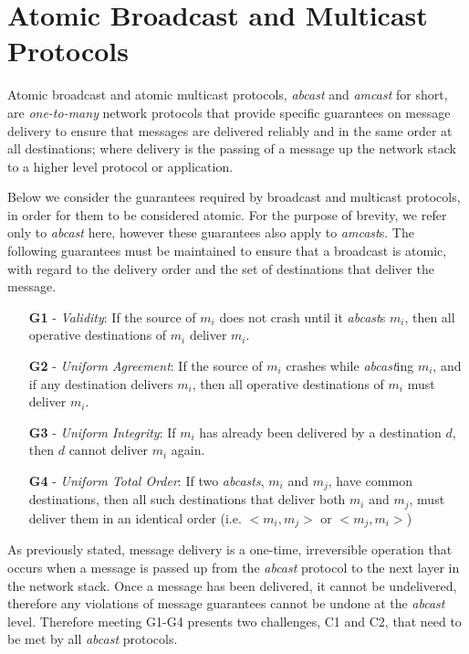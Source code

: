 \section{Atomic Broadcast and Multicast Protocols} \label{sec:atomic_guarantees}
Atomic broadcast and atomic multicast protocols, \emph{abcast} and \emph{amcast} for short, are \emph{one-to-many} network protocols that provide specific guarantees on message delivery to ensure that messages are delivered reliably and in the same order at all destinations; where delivery is the passing of a message up the network stack to a higher level protocol or application.  

Below we consider the guarantees required by broadcast and multicast protocols, in order for them to be considered atomic.  For the purpose of brevity, we refer only to \emph{abcast} here, however these guarantees also apply to \emph{amcast}s.  The following guarantees must be maintained to ensure that a broadcast is atomic, with regard to the delivery order and the set of destinations that deliver the message.  

\begin{itemize}
    \item [\textbf{G1}] - \emph{Validity}: If the source of $m_i$ does not crash until it \emph{abcast}s $m_i$, then all operative destinations of $m_i$ deliver $m_i$.
    \item [\textbf{G2}] - \emph{Uniform Agreement}: If the source of $m_i$ crashes while \emph{abcast}ing $m_i$, and if any destination delivers $m_i$, then all operative
destinations of $m_i$ must deliver $m_i$.
    \item [\textbf{G3}] - \emph{Uniform Integrity}: If $m_i$ has already been delivered by a destination $d$, then $d$ cannot deliver $m_i$ again.  
    \item [\textbf{G4}] - \emph{Uniform Total Order}: If two \emph{\emph{abcast}s}, $m_i$ and $m_j$, have
common destinations, then all such destinations that deliver both $m_i$ and $m_j$, must deliver them in an identical order (i.e. $<m_i, m_j>$ or $<m_j, m_i>$)
\end{itemize}

As previously stated, message delivery is a one-time, irreversible operation that occurs when a message is passed up from the \emph{abcast} protocol to the next layer in the network stack. Once a message has been delivered, it cannot be undelivered, therefore any violations of message guarantees cannot be undone at the \emph{abcast} level.  Therefore meeting G1-G4 presents two challenges, C1 and C2, that need to be met by all \emph{abcast} protocols.

